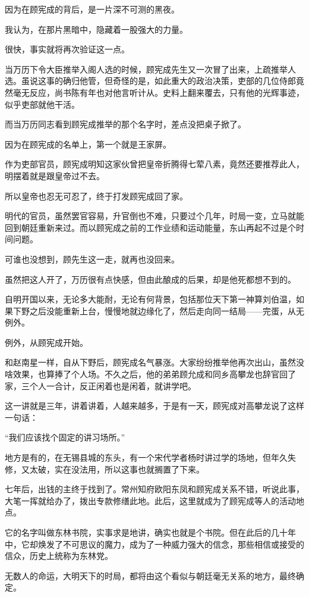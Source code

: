 \begin{multicols}{\theparacolNo}
		因为在顾宪成的背后，是一片深不可测的黑夜。

		我认为，在那片黑暗中，隐藏着一股强大的力量。

		很快，事实就将再次验证这一点。

		当万历下令大臣推举入阁人选的时候，顾宪成先生又一次冒了出来，上疏推举人选。虽说这事的确归他管，但奇怪的是，如此重大的政治决策，吏部的几位侍郎竟然毫无反应，尚书陈有年也对他言听计从。史料上翻来覆去，只有他的光辉事迹，似乎吏部就他干活。

		而当万历同志看到顾宪成推举的那个名字时，差点没把桌子掀了。

		因为在顾宪成的名单上，第一个就是王家屏。

		作为吏部官员，顾宪成明知这家伙曾把皇帝折腾得七荤八素，竟然还要推荐此人，明摆着就是跟皇帝过不去。

		所以皇帝也忍无可忍了，终于打发顾宪成回了家。

		明代的官员，虽然罢官容易，升官倒也不难，只要过个几年，时局一变，立马就能回到朝廷重新来过。而以顾宪成之前的工作业绩和运动能量，东山再起不过是个时间问题。

		可谁也没想到，顾先生这一走，就再也没回来。

		虽然把这人开了，万历很有点快感，但由此酿成的后果，却是他死都想不到的。

		自明开国以来，无论多大能耐，无论有何背景，包括那位天下第一神算刘伯温，如果下野之后没能重新上台，慢慢地就边缘化了，然后走向同一结局——完蛋，从无例外。

		例外，从顾宪成开始。

		和赵南星一样，自从下野后，顾宪成名气暴涨。大家纷纷推举他再次出山，虽然没啥效果，也算捧了个人场。不久之后，他的弟弟顾允成和同乡高攀龙也辞官回了家，三个人一合计，反正闲着也是闲着，就讲学吧。

		这一讲就是三年，讲着讲着，人越来越多，于是有一天，顾宪成对高攀龙说了这样一句话：

		“我们应该找个固定的讲习场所。”

		地方是有的，在无锡县城的东头，有一个宋代学者杨时讲过学的场地，但年久失修，又太破，实在没法用，所以这事也就搁置了下来。

		七年后，出钱的主终于找到了。常州知府欧阳东凤和顾宪成关系不错，听说此事，大笔一挥就给办了，拨出专款修缮此地。此后，这里就成为了顾宪成等人的活动地点。

		它的名字叫做东林书院，实事求是地讲，确实也就是个书院。但在此后的几十年中，它却焕发了不可思议的魔力，成为了一种威力强大的信念，那些相信或接受的信众，历史上统称为东林党。

		无数人的命运，大明天下的时局，都将由这个看似与朝廷毫无关系的地方，最终确定。


\end{multicols}
